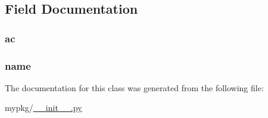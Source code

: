 \subsection{Field Documentation}
\hypertarget{classmypkg_1_1_my_class_a9063eb76c0cc024f54d08e4afdf284a3}{
\subsubsection[{ac}]{\setlength{\rightskip}{0pt plus 5cm}ac}}\label{classmypkg_1_1_my_class_a9063eb76c0cc024f54d08e4afdf284a3}
\hypertarget{classmypkg_1_1_my_class_ab74e6bf80237ddc4109968cedc58c151}{
\subsubsection[{name}]{\setlength{\rightskip}{0pt plus 5cm}name}}\label{classmypkg_1_1_my_class_ab74e6bf80237ddc4109968cedc58c151}


The documentation for this class was generated from the following file\-:\begin{DoxyCompactItemize}
\item 
mypkg/\hyperlink{____init_____8py}{\-\_\-\-\_\-init\-\_\-\-\_\-.\-py}\end{DoxyCompactItemize}
